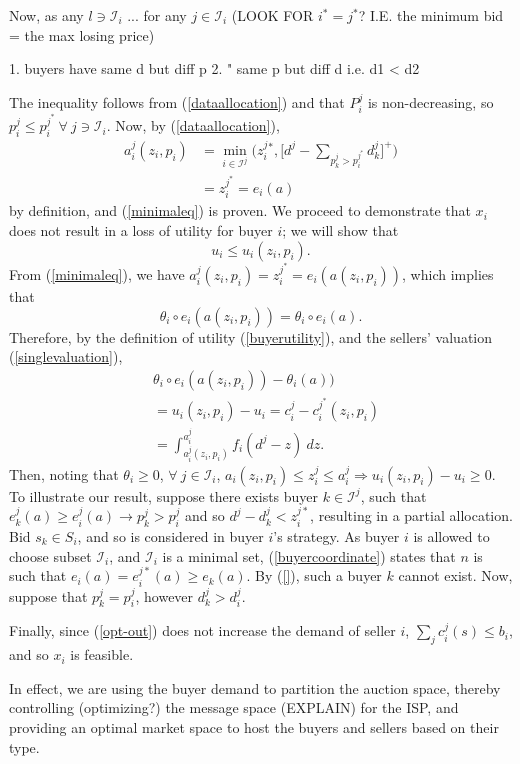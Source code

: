 \documentclass[12pt]{article}
\theoremstyle{definition}
\newcommand{\mcI}{\mathcal{I}}
\begin{document}
\begin{multicols}{2}
Now, as any $l \ni \mcI_i$ ... for any
$j\in\mcI_i$
(LOOK FOR $i^* = j^*$? I.E. the minimum bid = the max losing price)

1. buyers have same d but diff p
2. " same p but diff d i.e. d1 < d2

The inequality follows from
(\ref{dataallocation}) and that $P_i^j$ is non-decreasing, so $p_i^j \le p_i^{j^*} \ \forall \ j \ni \mcI_i$.
Now, by (\ref{dataallocation}),
\begin{align*}
     a_i^j(z_i,p_i) &=\min_{i\in\mcI^j}\bigg(z_i^j{^*}, \bigg\lbrack d^{j} - \sum_{p_k^{j}> p_i^{j^*}}
d_k^{j}\bigg\rbrack^+\bigg) \\
    &= z_i^{j^*}= e_i(a)
\end{align*}
by definition, and (\ref{minimaleq}) is proven.
We proceed to demonstrate that $x_i$ does not result in a loss of utility for
buyer $i$; we will show that
$$
    u_i \le u_i(z_i,p_i).
$$
From (\ref{minimaleq}), we have $a_i^{j}(z_i,p_i) = z_i^{j^*} = e_i(a(z_i,p_i))$, which
implies that 
$$
\theta_i\circ e_i(a(z_i,p_i)) = \theta_i\circ e_i(a).
$$ 
Therefore, by the definition of utility (\ref{buyerutility}),
and the sellers' valuation (\ref{singlevaluation}), 
\begin{align*}
    &\theta_i\circ e_i(a(z_i,p_i)) - \theta_i(a)) \\
    &= u_i(z_i,p_i) - u_i =  c_i^j -c_i^{j^*}(z_i,p_i)\\
    &= \displaystyle\int_{a_i^j(z_i,p_i)}^{a_i^j} f_i(d^j - z) \ dz.
\end{align*}
Then, noting that $\theta_i\ge 0$, $\forall \ j\in\mcI_i$, $a_i(z_i,p_i) \le
z_i^j \le a_i^j \Rightarrow u_i(z_i,p_i) - u_i \ge 0$.
To illustrate our result, suppose there exists buyer $k\in \mcI^j$, such that
$e_k^j(a) \ge e_i^j(a)
\rightarrow p_k^j > p_i^{j}$ and so $d^j - d_k^j < z_i^{j*}$, resulting in a
partial allocation. Bid $s_k \in S_i$, and so is considered in buyer $i$'s strategy. 
As buyer $i$ is allowed to choose subset $\mcI_i$, and $\mcI_i$ is a minimal
set, (\ref{buyercoordinate}) states that $n$ is such that $e_i(a) = e_i^{j*}(a)
\ge e_k(a)$. By (\ref{}), such a buyer $k$ cannot exist. 
Now, suppose that $p_k^j = p_i^j$, however $d_k^j > d_i^j$.



Finally, since (\ref{opt-out}) does
not increase the demand of seller $i$, $\sum_j c_i^j(s) \le b_i$, and so $x_i$ is feasible.

In effect, we are using the buyer demand
to partition the auction space, thereby 
controlling (optimizing?) the message space (EXPLAIN) for the
ISP, and providing an optimal market space to host the buyers and sellers based
on their type. \\


\end{multicols}
\end{document}
